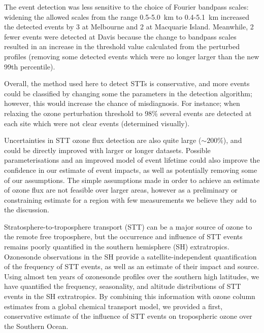 \documentclass[acp, manuscript]{copernicus} %
\begin{document}
  The event detection was less sensitive to the choice of Fourier bandpass scales: widening the allowed scales from the range 0.5-5.0~km to 0.4-5.1~km increased the detected events by 3 at Melbourne and 2 at Macquarie Island. Meanwhile, 2 fewer events were detected at Davis because the change to bandpass scales resulted in an increase in the threshold value calculated from the perturbed profiles (removing some detected events which were no longer larger than the new 99th percentile).
  
  Overall, the method used here to detect STTs is conservative, and more events could be classified by changing some the parameters in the detection algorithm; however, this would increase the chance of misdiagnosis. 
  For instance; when relaxing the ozone perturbation threshold to 98\% several events are detected at each site which were not clear events (determined visually).
  
  Uncertainties in STT ozone flux detection are also quite large ($\sim 200\%$), and could be directly improved with larger or longer datasets.
  Possible parameterisations and an improved model of event lifetime could also improve the confidence in our estimate of event impacts, as well as potentially removing some of our assumptions.
  The simple assumptions made in order to achieve an estimate of ozone flux are not feasible over larger areas, however as a preliminary or constraining estimate for a region with few measurements we believe they add to the discussion.
  
\conclusions  %
%
  
Stratosphere-to-troposphere transport (STT) can be a major source of ozone to the remote free troposphere, but the occurrence and influence of STT events remains poorly quantified in the southern hemisphere (SH) extratropics.
Ozonesonde observations in the SH provide a satellite-independent quantification of the frequency of STT events, as well as an estimate of their impact and source.
Using almost ten years of ozonesonde profiles over the southern high latitudes, we have quantified the frequency, seasonality, and altitude distributions of STT events in the SH extratropics. 
By combining this information with ozone column estimates from a global chemical transport model, we provided a first, conservative estimate of the influence of STT events on tropospheric ozone over the Southern Ocean.
\end{document}
